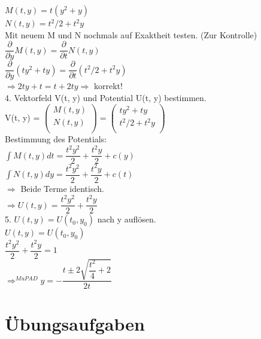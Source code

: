 \documentclass[11pt,final]{scrreprt}
\begin{document}
$M(t, y) = t(y^2+y) $\\
$N(t, y) = t^2/2 + t^2y$\\

Mit neuem M und N nochmals auf Exaktheit testen. (Zur Kontrolle)\\

$\dfrac{\partial}{\partial y}M(t, y) = \dfrac{\partial}{\partial t} N(t, y)$\\
$\dfrac{\partial}{\partial y} (ty^2+ty)  = \dfrac{\partial}{\partial t} (t^2/2 + t^2y)$\\

$\Rightarrow 2ty+t  = t+ 2ty \Rightarrow $ korrekt!\\

4. Vektorfeld V(t, y) und Potential U(t, y) bestimmen.\\

V(t, y) = $\left(\begin{array}{c}M(t, y) \\ N(t, y) \\\end{array}\right)=\left(\begin{array}{c}ty^2+ty \\ t^2/2 + t^2y \\\end{array}\right)$\\

Bestimmung des Potentials:\\
$\int M(t, y) dt = \dfrac{t^2y^2}{2} + \dfrac{t^2y}{2} + c(y)$\\
$\int N(t, y) dy = \dfrac{t^2y^2}{2} + \dfrac{t^2y}{2} + c(t)$\\

$\Rightarrow$ Beide Terme identisch. \\

$\Rightarrow U(t, y) = \dfrac{t^2y^2}{2} + \dfrac{t^2y}{2}$\\

5. $U(t, y) = U(t_0, y_0)$ nach y auflösen.\\


$U(t, y) = U(t_0, y_0)$\\
$\dfrac{t^2y^2}{2} + \dfrac{t^2y}{2} = 1$\\

$\Rightarrow^{MuPAD} y = -\dfrac{t\pm 2\sqrt{\dfrac{t^2}{4}+2}}{2t}$

\newpage
\section{Übungsaufgaben}
\end{document}
